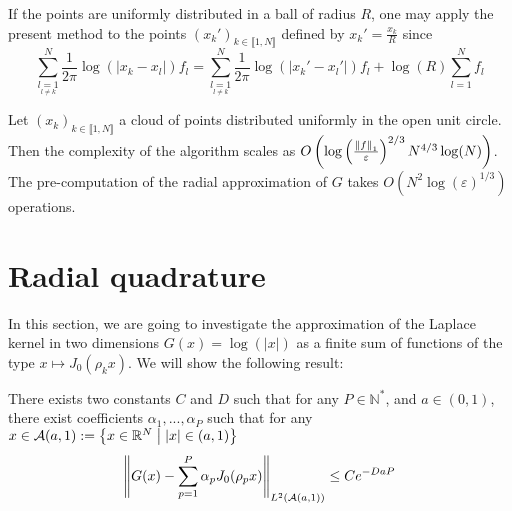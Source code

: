 \documentclass[11pt,a4paper]{article}
\begin{document}
If the points are uniformly distributed in a ball of radius $R$, one may apply the present method to the points $(x_k')_{k\in\llbracket1,N\rrbracket}$ defined by $x_k' = \frac{x_k}{R}$ since 
\[\sum_{\underset{l\neq k}{l=1}}^N \dfrac{1}{2\pi}\log(|x_k - x_l|)f_l = \sum_{\underset{l\neq k}{l=1}}^N \dfrac{1}{2\pi}\log(|x_k' - x_l'|)f_l + \log(R)\sum_{l=1}^N f_l \] 

\begin{Prop*} Let $(x_k)_{k\in \llbracket 1,N\rrbracket}$ a cloud of points distributed uniformly in the open unit circle. Then the complexity of the algorithm scales as $O\left(\log\left(\frac{\left\|f\right\|_1}{\varepsilon}\right)^{2/3} N^{4/3} \log(N)\right)$. The pre-computation of the radial approximation of $G$ takes $O(N^{2}\log(\varepsilon)^{1/3})$ operations.  
\end{Prop*}

\section{Radial quadrature}

In this section, we are going to investigate the approximation of the Laplace kernel in two dimensions $G(x) = \log(|x|)$ as a finite sum of functions of the type $x \mapsto J_0(\rho_k x)$.  We will show the following result: 
\begin{Prop}  There exists two constants $C$ and $D$ such that for any $P \in \mathbb{N}^*$, and $a\in (0,1)$, there exist coefficients $\alpha_1, ..., \alpha_P$ such that for any $x \in \mathcal{A}(a,1) := \left\{x\in \mathbb{R}^N\mathrel{}\middle|\mathrel{}|x|\in(a,1)\right\}$
\[ \left\|G(x) - \sum_{p=1}^P \alpha_p J_0(\rho_p x)\right\|_{L^2(\mathcal{A}(a,1))} \leq Ce^{-DaP}\]
\label{Prop:radial}

\end{Prop}
\end{document}
